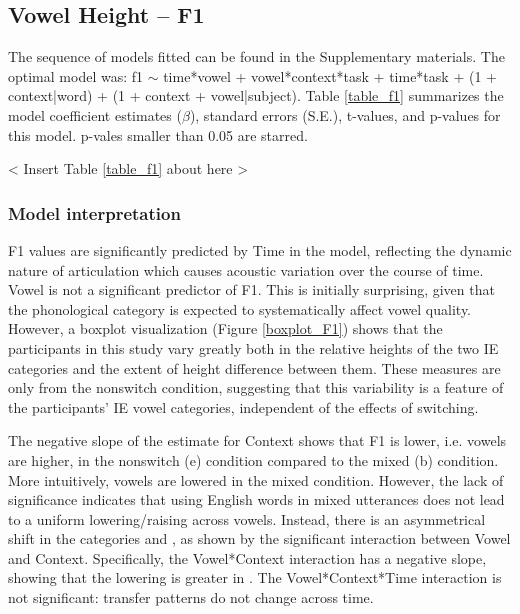 \documentclass[12 pt]{article}
\newcommand{\nt}[1]{\textipa{[#1]}} %
\begin{document}
\subsection{Vowel Height -- F1}

The sequence of models fitted can be found in the Supplementary materials. The optimal model was: f1 $\sim$ time*vowel + vowel*context*task + time*task + (1 + context|word) + (1 + context + vowel|subject). Table \ref{table_f1} summarizes the model coefficient estimates ($\beta$), standard errors (S.E.), t-values, and p-values for this model. p-vales smaller than 0.05 are starred. 

< Insert Table \ref{table_f1} about here >\\

\subsubsection*{Model interpretation}
F1 values are significantly predicted by Time in the model, reflecting the dynamic nature of articulation which causes acoustic variation over the course of time. %
Vowel is not a significant predictor of F1. This is initially surprising, given that the phonological category is expected to systematically affect vowel quality. However, a boxplot visualization (Figure \ref{boxplot_F1}) shows that the participants in this study vary greatly both in the relative heights of the two IE categories \nt{2, \ae} and the extent of height difference between them. These measures are only from the nonswitch condition, suggesting that this variability is a feature of the participants' IE vowel categories, independent of the effects of switching.  
 
The negative slope of the estimate for Context shows that F1 is lower, i.e. vowels are higher, in the nonswitch (e) condition compared to the mixed (b) condition. More intuitively, vowels are lowered in the mixed condition. However, the lack of significance indicates that using English words in mixed utterances does not lead to a uniform lowering/raising across vowels. Instead, there is an asymmetrical shift in the categories \nt{2} and \nt{\ae}, as shown by the significant interaction between Vowel and Context. Specifically, the Vowel*Context interaction has a negative slope, showing that the lowering is greater in \nt{2}. The Vowel*Context*Time interaction is not significant: transfer patterns do not change across time. 
 
\end{document}
